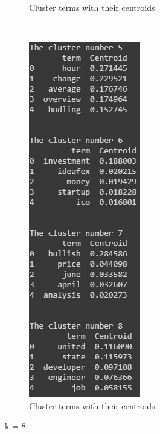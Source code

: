 \documentclass[a4paper, 12pt]{article}
\begin{document}
\begin{figure}[H]
\begin{subfigure}[a]{0.3\textwidth}
        \caption{Cluster terms with their centroids}
    \end{subfigure}
    ~ %
    \begin{subfigure}[b]{0.3\textwidth}
        \includegraphics[width=\textwidth]{res/k8.2.png}
        \caption{Cluster terms with their centroids}
    \end{subfigure}
		\caption{ k = 8}
    \label{fig:k8}				
\end{figure}
\end{document}
